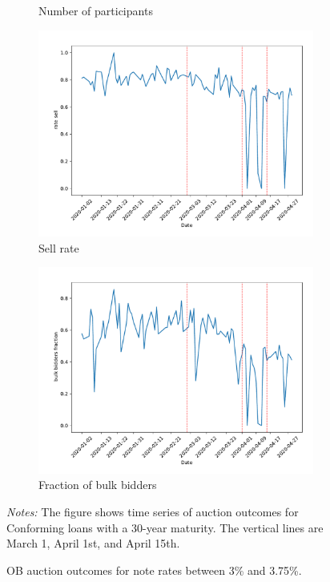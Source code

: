 \documentclass[11pt,a4paper]{article}
\begin{document}
\begin{figure}[h]
\begin{subfigure}[b]{0.49\textwidth}
      \caption{ Number of participants}
     \end{subfigure}
     \begin{subfigure}[b]{0.49\textwidth}
      \includegraphics[width=0.998\textwidth]{../results/figures/dummy_sell_any_mean_mat30_loan1_timeseries_nr_3_3.75.pdf}
      \caption{ Sell rate}
     \end{subfigure}
     \begin{subfigure}[b]{0.49\textwidth}
      \includegraphics[width=0.998\textwidth]{../results/figures/bulk_bidders_fraction_mean_mat30_loan1_timeseries_nr_3_3.75.pdf}
      \caption{ Fraction of bulk bidders}
     \end{subfigure}
     \caption{OB auction outcomes for note rates between 3\% and 3.75\%.  } 
   \begin{minipage}{\textwidth}
      \footnotesize{\textit{Notes:} The figure shows time series of auction outcomes for Conforming loans with a 30-year maturity. The vertical lines are March 1, April 1st, and April 15th.  } 
      \end{minipage}
\end{figure}
\end{document}
